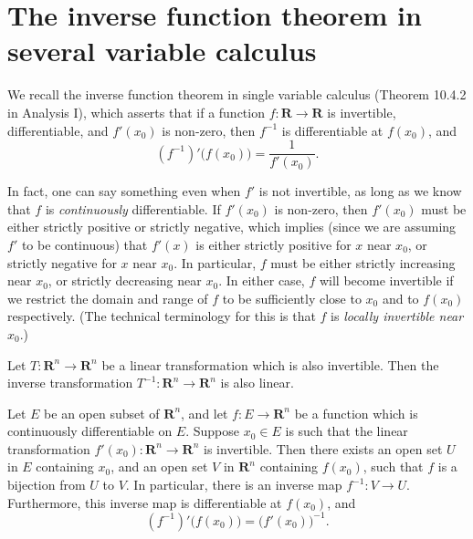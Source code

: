 \section{The inverse function theorem in several variable calculus}\label{sec 6.7}

\begin{note}
    We recall the inverse function theorem in single variable calculus (Theorem 10.4.2 in Analysis I), which asserts that if a function \(f : \mathbf{R} \to \mathbf{R}\) is invertible, differentiable, and \(f'(x_0)\) is non-zero, then \(f^{-1}\) is differentiable at \(f(x_0)\), and
    \[
        (f^{-1})'\big(f(x_0)\big) = \frac{1}{f'(x_0)}.
    \]

    In fact, one can say something even when \(f'\) is not invertible, as long as we know that \(f\) is \emph{continuously} differentiable.
    If \(f'(x_0)\) is non-zero, then \(f'(x_0)\) must be either strictly positive or strictly negative, which implies (since we are assuming \(f'\) to be continuous) that \(f'(x)\) is either strictly positive for \(x\) near \(x_0\), or strictly negative for \(x\) near \(x_0\).
    In particular, \(f\) must be either strictly increasing near \(x_0\), or strictly decreasing near \(x_0\).
    In either case, \(f\) will become invertible if we restrict the domain and range of \(f\) to be sufficiently close to \(x_0\) and to \(f(x_0)\) respectively.
    (The technical terminology for this is that \(f\) is \emph{locally invertible near \(x_0\)}.)
\end{note}

\begin{lemma}\label{6.7.1}
    Let \(T : \mathbf{R}^n \to \mathbf{R}^n\) be a linear transformation which is also invertible.
    Then the inverse transformation \(T^{-1} : \mathbf{R}^n \to \mathbf{R}^n\) is also linear.
\end{lemma}

\begin{theorem}\label{6.7.2}
    Let \(E\) be an open subset of \(\mathbf{R}^n\), and let \(f : E \to \mathbf{R}^n\) be a function which is continuously differentiable on \(E\).
    Suppose \(x_0 \in E\) is such that the linear transformation \(f'(x_0) : \mathbf{R}^n \to \mathbf{R}^n\) is invertible.
    Then there exists an open set \(U\) in \(E\) containing \(x_0\), and an open set \(V\) in \(\mathbf{R}^n\) containing \(f(x_0)\), such that \(f\) is a bijection from \(U\) to \(V\).
    In particular, there is an inverse map \(f^{-1} : V \to U\).
    Furthermore, this inverse map is differentiable at \(f(x_0)\), and
    \[
        (f^{-1})' \big(f(x_0)\big) = \big(f'(x_0)\big)^{-1}.
    \]
\end{theorem}

